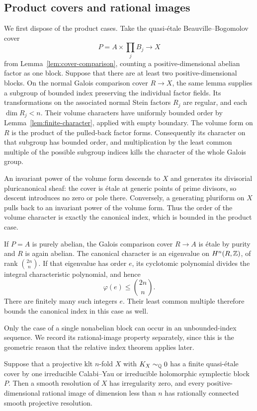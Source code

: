 \subsection{Product covers and rational images}

We first dispose of the product cases.  Take the quasi-\'etale
Beauville--Bogomolov cover
\[
                         P=A\times\prod_j B_j\longrightarrow X
\]
from Lemma~\ref{lem:cover-comparison}, counting a positive-dimensional
abelian factor as one block.  Suppose that there are at least two
positive-dimensional blocks.  On the normal Galois comparison cover
$R\to X$, the same lemma supplies a subgroup of bounded index
preserving the individual factor fields.  Its transformations on the
associated normal Stein factors $R_j$ are regular, and each
$\dim R_j<n$.  Their volume characters have uniformly bounded order
by Lemma~\ref{lem:finite-character}, applied with empty boundary.
The volume form on $R$ is the product of the pulled-back factor forms.
Consequently its character on that subgroup has bounded order, and
multiplication by the least common multiple of the possible subgroup
indices kills the character of the whole Galois group.

An invariant power of the volume form descends to $X$ and generates its
divisorial pluricanonical sheaf: the cover is \'etale at generic points
of prime divisors, so descent introduces no zero or pole there.
Conversely, a generating pluriform on $X$ pulls back to an invariant
power of the volume form.  Thus the order of the volume character is
exactly the canonical index, which is bounded in the product case.

If $P=A$ is purely abelian, the Galois comparison cover $R\to A$ is
\'etale by purity and $R$ is again abelian.  The canonical character
is an eigenvalue on $H^n(R,\mathbb Z)$, of rank $\binom{2n}{n}$.  If that
eigenvalue has order $e$, its cyclotomic polynomial divides the integral
characteristic polynomial, and hence
\[
                         \varphi(e)\le\binom{2n}{n}.
\]
There are finitely many such integers $e$.  Their least common multiple
therefore bounds the canonical index in this case as well.

Only the case of a single nonabelian block can occur in an
unbounded-index sequence.  We record its rational-image property
separately, since this is the geometric reason that the relative index
theorem applies later.

\begin{lemma}
\label{lem:single-block-images}
Suppose that a projective klt $n$-fold $X$ with $K_X\sim_{\mathbb Q}0$
has a finite quasi-\'etale cover by one irreducible Calabi--Yau or
irreducible holomorphic symplectic block $P$.  Then a smooth resolution
of $X$ has irregularity zero, and every positive-dimensional rational
image of dimension less than $n$ has rationally connected smooth
projective resolution.
\end{lemma}

